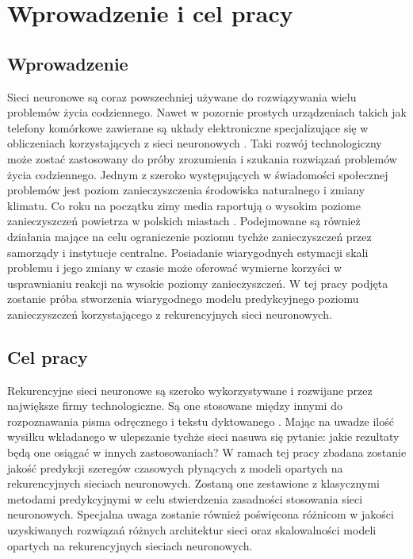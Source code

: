 \documentclass[10pt,a4paper]{article}
\begin{document}
\newpage
{}
\tableofcontents
\newpage

\section{Wprowadzenie i cel pracy}

\subsection{Wprowadzenie}
Sieci neuronowe są coraz powszechniej używane do rozwiązywania wielu problemów życia codziennego. Nawet w pozornie prostych urządzeniach takich jak telefony komórkowe zawierane są układy elektroniczne specjalizujące się w obliczeniach korzystających z sieci neuronowych \cite{appleNeuralEngine}. Taki rozwój technologiczny może zostać zastosowany do próby zrozumienia i szukania rozwiązań problemów życia codziennego. Jednym z szeroko występujących w świadomości społecznej problemów jest poziom zanieczyszczenia środowiska naturalnego i zmiany klimatu. Co roku na początku zimy media raportują o wysokim poziome zanieczyszczeń powietrza w polskich miastach \cite{airPollutionPoland}. Podejmowane są również działania mające na celu ograniczenie poziomu tychże zanieczyszczeń przez samorządy i instytucje centralne. Posiadanie wiarygodnych estymacji skali problemu i jego zmiany w czasie może oferować wymierne korzyści w usprawnianiu reakcji na wysokie poziomy zanieczyszczeń. W tej pracy podjęta zostanie próba stworzenia wiarygodnego modelu predykcyjnego poziomu zanieczyszczeń korzystającego z rekurencyjnych sieci neuronowych.

\subsection{Cel pracy}
Rekurencyjne sieci neuronowe są szeroko wykorzystywane i rozwijane przez największe firmy technologiczne. Są one stosowane między innymi do rozpoznawania pisma odręcznego i tekstu dyktowanego \cite{googleLSTM}. Mając na uwadze ilość wysiłku wkładanego w ulepszanie tychże sieci nasuwa się pytanie: jakie rezultaty będą one osiągać w innych zastosowaniach? W ramach tej pracy zbadana zostanie jakość predykcji szeregów czasowych płynących z modeli opartych na rekurencyjnych sieciach neuronowych. Zostaną one zestawione z klasycznymi metodami predykcyjnymi w celu stwierdzenia zasadności stosowania sieci neuronowych. Specjalna uwaga zostanie również poświęcona różnicom w jakości uzyskiwanych rozwiązań różnych architektur sieci oraz skalowalności modeli opartych na rekurencyjnych sieciach neuronowych. 
\end{document}
